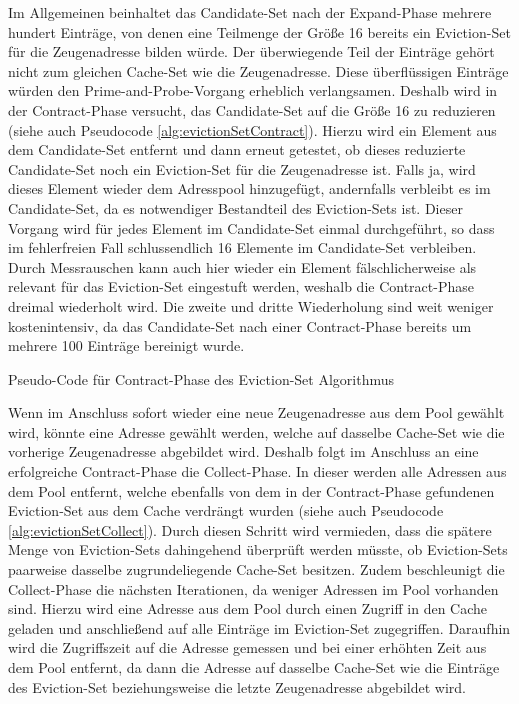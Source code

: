 Im Allgemeinen beinhaltet das Candidate-Set nach der Expand-Phase mehrere hundert Einträge, von denen eine Teilmenge der Größe 16 bereits ein Eviction-Set für die Zeugenadresse bilden würde. 
Der überwiegende Teil der Einträge gehört nicht zum gleichen Cache-Set wie die Zeugenadresse.
Diese überflüssigen Einträge würden den Prime-and-Probe-Vorgang erheblich verlangsamen. Deshalb wird in der Contract-Phase versucht, das Candidate-Set auf die Größe 16 zu reduzieren (siehe auch Pseudocode \ref{alg:evictionSetContract}).
Hierzu wird ein Element aus dem Candidate-Set entfernt und dann erneut getestet, ob dieses reduzierte Candidate-Set noch ein Eviction-Set für die Zeugenadresse ist.
Falls ja, wird dieses Element wieder dem Adresspool hinzugefügt, andernfalls verbleibt es im Candidate-Set, da es notwendiger Bestandteil des Eviction-Sets ist.
Dieser Vorgang wird für jedes Element im Candidate-Set einmal durchgeführt, so dass im fehlerfreien Fall schlussendlich 16 Elemente im Candidate-Set verbleiben.
Durch Messrauschen kann auch hier wieder ein Element fälschlicherweise als relevant für das Eviction-Set eingestuft werden, weshalb die Contract-Phase dreimal wiederholt wird.
Die zweite und dritte Wiederholung sind weit weniger kostenintensiv, da das Candidate-Set nach einer Contract-Phase bereits um mehrere 100 Einträge bereinigt wurde.

\begin{algorithm}[h]
\DontPrintSemicolon
\caption{Pseudo-Code für Contract-Phase des Eviction-Set Algorithmus}
\label{alg:evictionSetContract}
\end{algorithm}

Wenn im Anschluss sofort wieder eine neue Zeugenadresse aus dem Pool gewählt wird, könnte eine Adresse gewählt werden, welche auf dasselbe Cache-Set wie die vorherige Zeugenadresse abgebildet wird.
Deshalb folgt im Anschluss an eine erfolgreiche Contract-Phase die Collect-Phase.
In dieser werden alle Adressen aus dem Pool entfernt, welche ebenfalls von dem in der Contract-Phase gefundenen Eviction-Set aus dem Cache verdrängt wurden (siehe auch Pseudocode \ref{alg:evictionSetCollect}).
Durch diesen Schritt wird vermieden, dass die spätere Menge von Eviction-Sets dahingehend überprüft werden müsste, ob Eviction-Sets paarweise dasselbe zugrundeliegende Cache-Set besitzen. 
Zudem beschleunigt die Collect-Phase die nächsten Iterationen, da weniger Adressen im Pool vorhanden sind.
Hierzu wird eine Adresse aus dem Pool durch einen Zugriff in den Cache geladen und anschließend auf alle Einträge im Eviction-Set zugegriffen.
Daraufhin wird die Zugriffszeit auf die Adresse gemessen und bei einer erhöhten Zeit aus dem Pool entfernt, da dann die Adresse auf dasselbe Cache-Set wie die Einträge des Eviction-Set beziehungsweise die letzte Zeugenadresse abgebildet wird.

